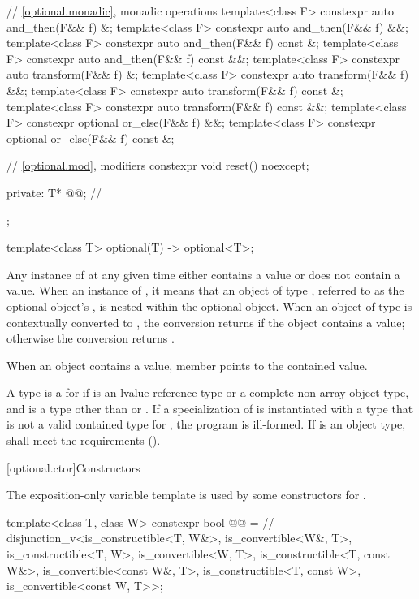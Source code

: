 \begin{codeblock}
{{    // \ref{optional.monadic}, monadic operations
    template<class F> constexpr auto and_then(F&& f) &;
    template<class F> constexpr auto and_then(F&& f) &&;
    template<class F> constexpr auto and_then(F&& f) const &;
    template<class F> constexpr auto and_then(F&& f) const &&;
    template<class F> constexpr auto transform(F&& f) &;
    template<class F> constexpr auto transform(F&& f) &&;
    template<class F> constexpr auto transform(F&& f) const &;
    template<class F> constexpr auto transform(F&& f) const &&;
    template<class F> constexpr optional or_else(F&& f) &&;
    template<class F> constexpr optional or_else(F&& f) const &;

    // \ref{optional.mod}, modifiers
    constexpr void reset() noexcept;

  private:
    T* @@;         // \expos
  };

  template<class T>
    optional(T) -> optional<T>;
}
\end{codeblock}

\pnum
Any instance of  at any given time either contains a value or does not contain a value.
When an instance of  ,
it means that an object of type , referred to as the optional object's ,
is nested within the optional object.
When an object of type  is contextually converted to ,
the conversion returns  if the object contains a value;
otherwise the conversion returns .

\pnum
When an  object contains a value,
member  points to the contained value.

\pnum
A type  is a
 for 
if  is an lvalue reference type or a complete non-array object type,
and  is a type other than  or .
If a specialization of  is instantiated with a type 
that is not a valid contained type for , the program is ill-formed.
If  is an object type,
 shall meet the  requirements ().

[optional.ctor]{Constructors}

\pnum
The exposition-only variable template 
is used by some constructors for .
\begin{codeblock}
template<class T, class W>
constexpr bool @@ =  // \expos
  disjunction_v<is_constructible<T, W&>, is_convertible<W&, T>,
                is_constructible<T, W>, is_convertible<W, T>,
                is_constructible<T, const W&>, is_convertible<const W&, T>,
                is_constructible<T, const W>, is_convertible<const W, T>>;
\end{codeblock}

